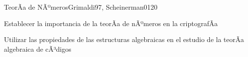 \begin{syllabus}
\begin{unit}{TeorÃ­a de NÃºmeros}{Grimaldi97, Scheinerman01}{20}
   \begin{unitgoals}
      \item Establecer la importancia de la teorÃ­a de nÃºmeros en la criptografÃ­a
      \item Utilizar las propiedades de las estructuras algebraicas en el estudio de la teorÃ­a algebraica de cÃ³digos
   \end{unitgoals}
\end{unit}

\begin{coursebibliography}
\end{coursebibliography}

\end{syllabus}

%
